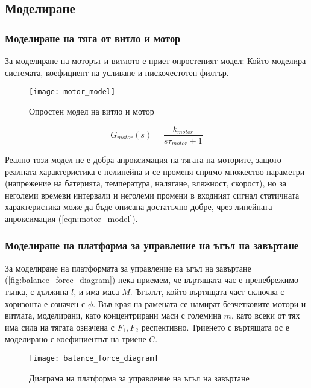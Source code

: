 \subsection{Моделиране}

\subsubsection{Моделиране на тяга от витло и мотор}

За моделиране на моторът и витлото е приет опростеният модел:
Който моделира системата, коефициент на усливане и нискочестотен филтър.

\begin{figure}[htpb!]
    \centering
    \texttt{[image: motor\_model]}
    \caption{Опростен модел на витло и мотор}
    \label{fig:motor_model}
\end{figure}

\begin{equation}
    G_{motor}(s) = \frac{k_{motor}}{s \tau_{motor} + 1}
    \label{eqn:motor_model}
\end{equation}

Реално този модел не е добра апроксимация на тягата на моторите,
защото реалната характеристика е нелинейна и се променя спрямо множество параметри (напрежение на батерията, температура, налягане, вляжност, скорост),
но за неголеми времеви интервали и неголеми промени в входният сигнал статичната характеристика
може да бъде описана достатъчно добре, чрез линейната апроксимация (\autoref{eqn:motor_model}).


\subsubsection{Моделиране на платформа за управление на ъгъл на завъртане}

За моделиране на платформата за управление на ъгъл на завъртане (\autoref{fig:balance_force_diagram})
нека приемем, че въртящата час е пренебрежимо тънка, с дължина \(l\), и има маса \(M\). 
Ъгълът, който въртящата част сключва с хоризонта е означен с \(\phi\).
Във края на рамената се намират безчетковите мотори и витлата, моделирани, като концентрирани
маси с големина \(m\), като всеки от тях има сила на тягата означена с \(F_1, F_2\) респективно.
Триенето с въртящата ос е моделирано с коефициентът на триене \(C\).

\begin{figure}[htpb!]
    \centering
    \texttt{[image: balance\_force\_diagram]}
    \caption{Диаграма на платформа за управление на ъгъл на завъртане}
    \label{fig:balance_force_diagram}
\end{figure}

